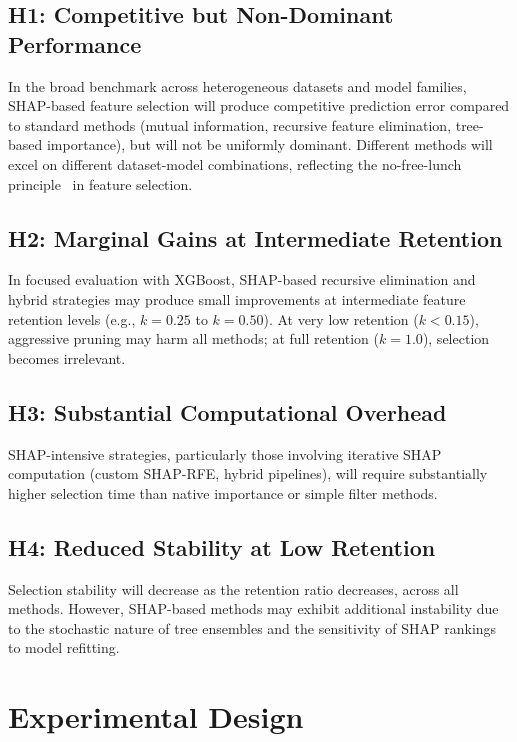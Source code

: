 \subsection{H1: Competitive but Non-Dominant Performance}

In the broad benchmark across heterogeneous datasets and model families, SHAP-based feature selection will produce competitive prediction error compared to standard methods (mutual information, recursive feature elimination, tree-based importance), but will not be uniformly dominant. Different methods will excel on different dataset-model combinations, reflecting the no-free-lunch principle~\cite{wolpert2002no} in feature selection.

\subsection{H2: Marginal Gains at Intermediate Retention}

In focused evaluation with XGBoost, SHAP-based recursive elimination and hybrid strategies may produce small improvements at intermediate feature retention levels (e.g., $k=0.25$ to $k=0.50$). At very low retention ($k < 0.15$), aggressive pruning may harm all methods; at full retention ($k=1.0$), selection becomes irrelevant.

\subsection{H3: Substantial Computational Overhead}

SHAP-intensive strategies, particularly those involving iterative SHAP computation (custom SHAP-RFE, hybrid pipelines), will require substantially higher selection time than native importance or simple filter methods.

\subsection{H4: Reduced Stability at Low Retention}

Selection stability will decrease as the retention ratio decreases, across all methods. However, SHAP-based methods may exhibit additional instability due to the stochastic nature of tree ensembles and the sensitivity of SHAP rankings to model refitting.

\section{Experimental Design}

